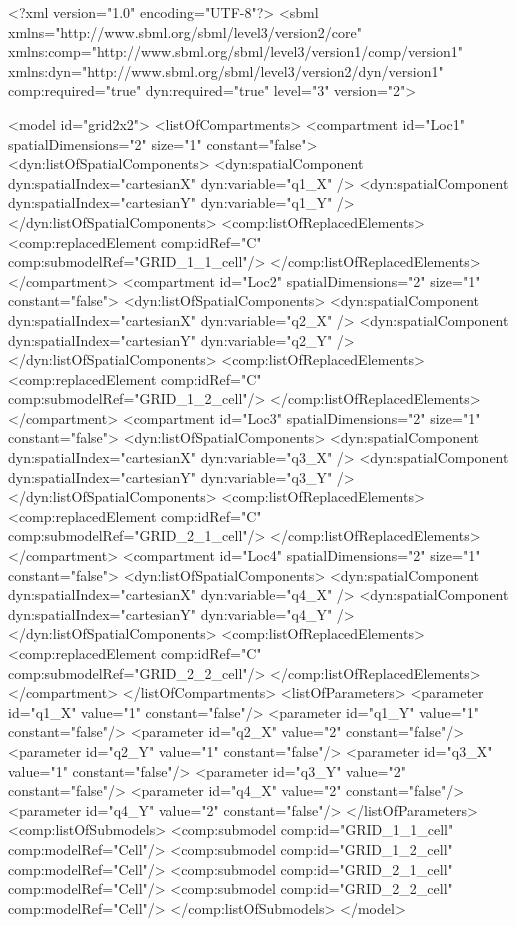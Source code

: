 \begin{example}
<?xml version="1.0" encoding="UTF-8"?>
	<sbml xmlns="http://www.sbml.org/sbml/level3/version2/core" 
		  xmlns:comp="http://www.sbml.org/sbml/level3/version1/comp/version1"
		  xmlns:dyn="http://www.sbml.org/sbml/level3/version2/dyn/version1"
		  comp:required="true" dyn:required="true" level="3" version="2">

	<model id="grid2x2">
		<listOfCompartments>
			<compartment id="Loc1" spatialDimensions="2" size="1" constant="false">
				<dyn:listOfSpatialComponents>
					<dyn:spatialComponent dyn:spatialIndex="cartesianX" dyn:variable="q1_X" />
					<dyn:spatialComponent dyn:spatialIndex="cartesianY" dyn:variable="q1_Y" />
				</dyn:listOfSpatialComponents>
				<comp:listOfReplacedElements>
					<comp:replacedElement comp:idRef="C" comp:submodelRef="GRID_1_1_cell"/>
				</comp:listOfReplacedElements>
			</compartment>	
			<compartment id="Loc2" spatialDimensions="2" size="1" constant="false">
				<dyn:listOfSpatialComponents>
					<dyn:spatialComponent dyn:spatialIndex="cartesianX" dyn:variable="q2_X" />
					<dyn:spatialComponent dyn:spatialIndex="cartesianY" dyn:variable="q2_Y" />
				</dyn:listOfSpatialComponents>
				<comp:listOfReplacedElements>
					<comp:replacedElement comp:idRef="C" comp:submodelRef="GRID_1_2_cell"/>
				</comp:listOfReplacedElements>
			</compartment>	
			<compartment id="Loc3" spatialDimensions="2" size="1" constant="false">
				<dyn:listOfSpatialComponents>
					<dyn:spatialComponent dyn:spatialIndex="cartesianX" dyn:variable="q3_X" />
					<dyn:spatialComponent dyn:spatialIndex="cartesianY" dyn:variable="q3_Y" />
				</dyn:listOfSpatialComponents>
				<comp:listOfReplacedElements>
					<comp:replacedElement comp:idRef="C" comp:submodelRef="GRID_2_1_cell"/>
				</comp:listOfReplacedElements>
			</compartment>	
			<compartment id="Loc4" spatialDimensions="2" size="1" constant="false">
				<dyn:listOfSpatialComponents>
					<dyn:spatialComponent dyn:spatialIndex="cartesianX" dyn:variable="q4_X" />
					<dyn:spatialComponent dyn:spatialIndex="cartesianY" dyn:variable="q4_Y" />
				</dyn:listOfSpatialComponents>
				<comp:listOfReplacedElements>
					<comp:replacedElement comp:idRef="C" comp:submodelRef="GRID_2_2_cell"/>
				</comp:listOfReplacedElements>
			</compartment>	
		</listOfCompartments>
		<listOfParameters>
			<parameter id="q1_X" value="1" constant="false"/>
			<parameter id="q1_Y"  value="1" constant="false"/>
			<parameter id="q2_X" value="2" constant="false"/>
			<parameter id="q2_Y"  value="1" constant="false"/>
			<parameter id="q3_X" value="1" constant="false"/>
			<parameter id="q3_Y"  value="2" constant="false"/>
			<parameter id="q4_X" value="2" constant="false"/>
			<parameter id="q4_Y"  value="2" constant="false"/>
		</listOfParameters>
		<comp:listOfSubmodels>
			<comp:submodel comp:id="GRID_1_1_cell" comp:modelRef="Cell"/>
			<comp:submodel comp:id="GRID_1_2_cell" comp:modelRef="Cell"/>
			<comp:submodel comp:id="GRID_2_1_cell" comp:modelRef="Cell"/>
			<comp:submodel comp:id="GRID_2_2_cell" comp:modelRef="Cell"/>
		</comp:listOfSubmodels>
	</model>


\end{example}
